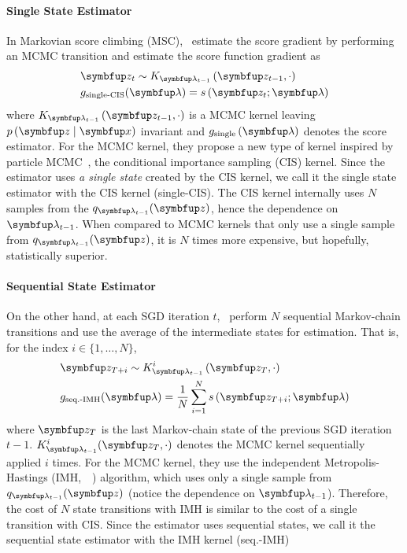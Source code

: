\vspace{-0.05in}
\paragraph{Single State Estimator}
In Markovian score climbing (MSC),~\citet{NEURIPS2020_b2070693} estimate the score gradient by performing an MCMC transition and estimate the score function gradient as
\vspace{-0.05in}
\begin{align*}
  &\vz_t \sim K_{\vlambda_{t-1}}\left(\vz_{t-1}, \cdot \right) \\
  &g_{\text{single-CIS}}(\vlambda) = s\,(\vz_t; \vlambda)
\end{align*}
where \(K_{\vlambda_{t-1}}\left(\vz_{t-1}, \cdot\right)\) is a MCMC kernel leaving \(p\,(\vz\mid\vx)\) invariant and \(g_{\text{single}}\left(\vlambda\right)\) denotes the score estimator.
For the MCMC kernel, they propose a new type of kernel inspired by particle MCMC~\citep{andrieu_particle_2010, andrieu_uniform_2018}, the conditional importance sampling (CIS) kernel.
Since the estimator uses \textit{a single state} created by the CIS kernel, we call it the single state estimator with the CIS kernel (single-CIS).
The CIS kernel internally uses \(N\) samples from the \(q_{\vlambda_{t-1}}(\vz)\), hence the dependence on \(\vlambda_{t-1}\).
When compared to MCMC kernels that only use a single sample from \(q_{\vlambda_{t-1}}(\vz)\), it is \(N\) times more expensive, but hopefully, statistically superior.

\vspace{-0.08in}
\paragraph{Sequential State Estimator}
On the other hand, at each SGD iteration \(t\),~\citet{pmlr-v124-ou20a} perform \(N\) sequential Markov-chain transitions and use the average of the intermediate states for estimation.
That is, for the index \(i \in \{1, \ldots, N\}\),
\vspace{-0.05in}
\begin{align*}
  &\vz_{T+i} \sim K_{\vlambda_{t-1}}^i\left(\vz_{T}, \cdot \right) \\
  &g_{\text{seq.-IMH}}(\vlambda) = \frac{1}{N} \sum_{i=1}^N s\,(\vz_{T+i}; \vlambda)
\end{align*}
where \(\vz_T\) is the last Markov-chain state of the previous SGD iteration 
\(t-1\).
\(K^{i}_{\vlambda_{t-1}}(\vz_{T}, \cdot)\) denotes the MCMC kernel sequentially applied \(i\) times.
For the MCMC kernel, they use the independent Metropolis-Hastings (IMH,~\citealt[Algorithm 25]{robert_monte_2004}~\citealt{hastings_monte_1970}) algorithm, which uses only a single sample from \(q_{\vlambda_{t-1}}(\vz)\) (notice the dependence on \(\vlambda_{t-1}\)).
Therefore, the cost of \(N\) state transitions with IMH is similar to the cost of a single transition with CIS.
Since the estimator uses sequential states, we call it the sequential state estimator with the IMH kernel (seq.-IMH)

